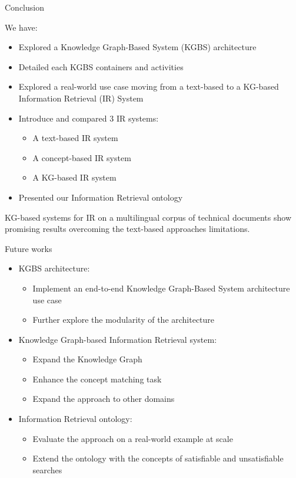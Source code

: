 \begin{frame}{Conclusion}

    We have:
    \begin{itemize}
        \item Explored a Knowledge Graph-Based System (KGBS) architecture
        \item Detailed each KGBS containers and activities
        \item Explored a real-world use case moving from a text-based to a KG-based Information Retrieval (IR) System
        \item Introduce and compared $3$ IR systems:
        \begin{itemize}
            \item A text-based IR system
            \item A concept-based IR system
            \item A KG-based IR system
        \end{itemize}
        \item Presented our Information Retrieval ontology
    \end{itemize}

     \begin{center}
        KG-based systems for IR on a multilingual corpus of technical documents show promising results overcoming the text-based approaches limitations.
     \end{center}

\end{frame}

\begin{frame}{Future works}

    \begin{itemize}
        \item KGBS architecture:
        \begin{itemize}
            \item Implement an end-to-end Knowledge Graph-Based System architecture use case
            \item Further explore the modularity of the architecture
        \end{itemize}
        \item Knowledge Graph-based Information Retrieval system:
        \begin{itemize}
            \item Expand the Knowledge Graph
            \item Enhance the concept matching task
            \item Expand the approach to other domains
        \end{itemize}
        \item Information Retrieval ontology:
        \begin{itemize}
            \item Evaluate the approach on a real-world example at scale
            \item Extend the ontology with the concepts of satisfiable and unsatisfiable searches
        \end{itemize}
    \end{itemize}

\end{frame}

